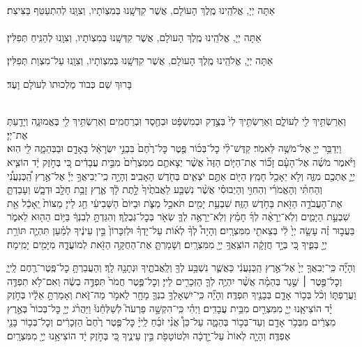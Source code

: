 \documentclass[twoside, openany, parskip=half, 11pt]{book}
\begin{document}
\\
אַתָּה יְיָ, אֱלֹהֵֽינוּ מֶֽלֶךְ הָעוֹלָם, אֲשֶׁר קִדְּשָֽׁנוּ בְּמִצְוֹתָיו, וְצִוָּֽנוּ לְהִתְעַטֵּף בַּצִּיצִת׃\\
\\
אַתָּה יְיָ, אֱלֹהֵֽינוּ מֶֽלֶךְ הָעוֺלָם, אֲשֶׁר קִדְּשָֽׁנוּ בְּמִצְוֹתָיו, וְצִוָֽנוּ לְהַנִּֽיחַ תְּפִלִּין׃

אַתָּה יְיָ, אֱלֹהֵֽינוּ מֶֽלֶךְ הָעוֺלָם, אֲשֶׁר קִדְּשָֽׁנוּ בְּמִצְוֹתָיו, וְצִוָֽנוּ עַל־מִצְוַת תְּפִלִּין׃

בָּרוּךְ שֵׁם כְּבוֺד מַלְכוּתוֺ לְעוֺלָם וָעֶד׃


\\
וְאֵרַשְׂתִּ֥יךְ לִ֖י לְעוֹלָ֑ם וְאֵרַשְׂתִּ֥יךְ לִי֙ בְּצֶ֣דֶק וּבְמִשְׁפָּ֔ט וּבְחֶ֖סֶד וּֽבְרַחֲמִֽים׃ וְאֵרַשְׂתִּ֥יךְ לִ֖י בֶּאֱמוּנָ֑ה וְיָדַ֖עַתְּ אֶת־יְיָ׃\\
וַיְדַבֵּ֥ר יְיָ֖ אֶל־מֹשֶׁ֥ה לֵּאמֹֽר׃ קַדֶּשׁ־לִ֨י כׇל־בְּכ֜וֹר פֶּ֤טֶר כׇּל־רֶ֙חֶם֙ בִּבְנֵ֣י יִשְׂרָאֵ֔ל בָּאָדָ֖ם וּבַבְּהֵמָ֑ה לִ֖י הֽוּא׃ וַיֹּ֨אמֶר מֹשֶׁ֜ה אֶל־הָעָ֗ם זָכ֞וֹר אֶת־הַיּ֤וֹם הַזֶּה֙ אֲשֶׁ֨ר יְצָאתֶ֤ם מִמִּצְרַ֙יִם֙ מִבֵּ֣ית עֲבָדִ֔ים כִּ֚י בְּחֹ֣זֶק יָ֔ד הוֹצִ֧יא יְיָ֛ אֶתְכֶ֖ם מִזֶּ֑ה וְלֹ֥א יֵאָכֵ֖ל חָמֵֽץ׃ הַיּ֖וֹם אַתֶּ֣ם יֹצְאִ֑ים בְּחֹ֖דֶשׁ הָאָבִֽיב׃ וְהָיָ֣ה כִֽי־יְבִיאֲךָ֣ יְיָ֡ אֶל־אֶ֣רֶץ הַֽ֠כְּנַעֲנִ֠י וְהַחִתִּ֨י וְהָאֱמֹרִ֜י וְהַחִוִּ֣י וְהַיְבוּסִ֗י אֲשֶׁ֨ר נִשְׁבַּ֤ע לַאֲבֹתֶ֙יךָ֙ לָ֣תֶת לָ֔ךְ אֶ֛רֶץ זָבַ֥ת חָלָ֖ב וּדְבָ֑שׁ וְעָבַדְתָּ֛ אֶת־הָעֲבֹדָ֥ה הַזֹּ֖את בַּחֹ֥דֶשׁ הַזֶּֽה׃ שִׁבְעַ֥ת יָמִ֖ים תֹּאכַ֣ל מַצֹּ֑ת וּבַיּוֹם֙ הַשְּׁבִיעִ֔י חַ֖ג לַייָ׃ מַצּוֹת֙ יֵֽאָכֵ֔ל אֵ֖ת שִׁבְעַ֣ת הַיָּמִ֑ים וְלֹֽא־יֵרָאֶ֨ה לְךָ֜ חָמֵ֗ץ וְלֹֽא־יֵרָאֶ֥ה לְךָ֛ שְׂאֹ֖ר בְּכׇל־גְּבֻלֶֽךָ׃ וְהִגַּדְתָּ֣ לְבִנְךָ֔ בַּיּ֥וֹם הַה֖וּא לֵאמֹ֑ר בַּעֲב֣וּר זֶ֗ה עָשָׂ֤ה יְיָ֙ לִ֔י בְּצֵאתִ֖י מִמִּצְרָֽיִם׃ וְהָיָה֩ לְךָ֨ לְא֜וֹת עַל־יָדְךָ֗ וּלְזִכָּרוֹן֙ בֵּ֣ין עֵינֶ֔יךָ לְמַ֗עַן תִּהְיֶ֛ה תּוֹרַ֥ת יְיָ֖ בְּפִ֑יךָ כִּ֚י בְּיָ֣ד חֲזָקָ֔ה הוֹצִֽאֲךָ֥ יְיָ֖ מִמִּצְרָֽיִם׃ וְשָׁמַרְתָּ֛ אֶת־הַחֻקָּ֥ה הַזֹּ֖את לְמוֹעֲדָ֑הּ מִיָּמִ֖ים יָמִֽימָה׃

וְהָיָ֞ה כִּֽי־יְבִאֲךָ֤ יְיָ֙ אֶל־אֶ֣רֶץ הַֽכְּנַעֲנִ֔י כַּאֲשֶׁ֛ר נִשְׁבַּ֥ע לְךָ֖ וְלַֽאֲבֹתֶ֑יךָ וּנְתָנָ֖הּ לָֽךְ׃ וְהַעֲבַרְתָּ֥ כׇל־פֶּֽטֶר־רֶ֖חֶם לַֽייָ֑ וְכׇל־פֶּ֣טֶר ׀ שֶׁ֣גֶר בְּהֵמָ֗ה אֲשֶׁ֨ר יִהְיֶ֥ה לְךָ֛ הַזְּכָרִ֖ים לַייָ׃ וְכׇל־פֶּ֤טֶר חֲמֹר֙ תִּפְדֶּ֣ה בְשֶׂ֔ה וְאִם־לֹ֥א תִפְדֶּ֖ה וַעֲרַפְתּ֑וֹ וְכֹ֨ל בְּכ֥וֹר אָדָ֛ם בְּבָנֶ֖יךָ תִּפְדֶּֽה׃ וְהָיָ֞ה כִּֽי־יִשְׁאָלְךָ֥ בִנְךָ֛ מָחָ֖ר לֵאמֹ֣ר מַה־זֹּ֑את וְאָמַרְתָּ֣ אֵלָ֔יו בְּחֹ֣זֶק יָ֗ד הוֹצִיאָ֧נוּ יְיָ֛ מִמִּצְרַ֖יִם מִבֵּ֥ית עֲבָדִֽים׃ וַיְהִ֗י כִּֽי־הִקְשָׁ֣ה פַרְעֹה֮ לְשַׁלְּחֵ֒נוּ֒ וַיַּהֲרֹ֨ג יְיָ֤ כׇּל־בְּכוֹר֙ בְּאֶ֣רֶץ מִצְרַ֔יִם מִבְּכֹ֥ר אָדָ֖ם וְעַד־בְּכ֣וֹר בְּהֵמָ֑ה עַל־כֵּן֩ אֲנִ֨י זֹבֵ֜חַ לַֽייָ֗ כׇּל־פֶּ֤טֶר רֶ֙חֶם֙ הַזְּכָרִ֔ים וְכׇל־בְּכ֥וֹר בָּנַ֖י אֶפְדֶּֽה׃ וְהָיָ֤ה לְאוֹת֙ עַל־יָ֣דְכָ֔ה וּלְטוֹטָפֹ֖ת בֵּ֣ין עֵינֶ֑יךָ כִּ֚י בְּחֹ֣זֶק יָ֔ד הוֹצִיאָ֥נוּ יְיָ֖ מִמִּצְרָֽיִם׃
\end{document}
